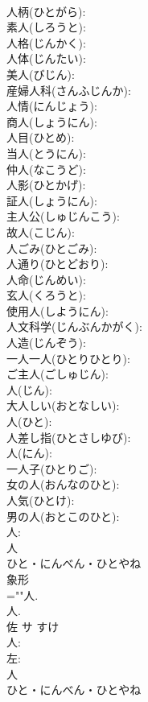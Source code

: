 \documentclass[8pt]{extreport}
\begin{document}
\begin{CJK}{UTF8}{min}
\\	人柄(ひとがら): 
\\	素人(しろうと): 
\\	人格(じんかく): 
\\	人体(じんたい): 
\\	美人(びじん): 
\\	産婦人科(さんふじんか): 
\\	人情(にんじょう): 
\\	商人(しょうにん): 
\\	人目(ひとめ): 
\\	当人(とうにん): 
\\	仲人(なこうど): 
\\	人影(ひとかげ): 
\\	証人(しょうにん): 
\\	主人公(しゅじんこう): 
\\	故人(こじん): 
\\	人ごみ(ひとごみ): 
\\	人通り(ひとどおり): 
\\	人命(じんめい): 
\\	玄人(くろうと): 
\\	使用人(しようにん): 
\\	人文科学(じんぶんかがく): 
\\	人造(じんぞう): 
\\	一人一人(ひとりひとり): 
\\	ご主人(ごしゅじん): 
\\	人(じん): 
\\	大人しい(おとなしい): 
\\	人(ひと): 
\\	人差し指(ひとさしゆび): 
\\	人(にん): 
\\	一人子(ひとりご): 
\\	女の人(おんなのひと): 
\\	人気(ひとけ): 
\\	男の人(おとこのひと): 
\\	人: 
\\	人	
\\	ひと・にんべん・ひとやね	
\\	象形 
\\	=""人.
\\	人.
\\	佐	サ		すけ	
\\	人: 
\\	左: 
\\	人	
\\	ひと・にんべん・ひとやね	

\end{CJK}
\end{document}
